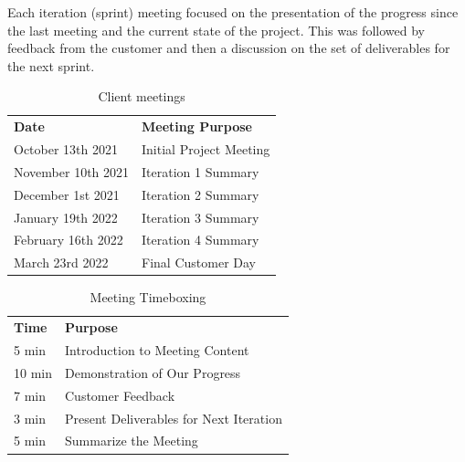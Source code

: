\documentclass{l3proj}
\begin{document}
        

        Each iteration (sprint) meeting focused on the presentation of the progress since the last meeting and the current state of the project. This was followed by feedback from the customer and then a discussion on the set of deliverables for the next sprint.
        
        \begin{center}
            \begin{table}[H]
                \centering
                \begin{tabular}{ll}
                \textbf{Date}      & \textbf{Meeting Purpose}
                \\
                October 13th 2021  & Initial Project Meeting \\
                November 10th 2021 & Iteration 1 Summary     \\
                December 1st 2021  & Iteration 2 Summary     \\
                January 19th 2022  & Iteration 3 Summary     \\
                February 16th 2022 & Iteration 4 Summary     \\
                March 23rd 2022    & Final Customer Day   
                \end{tabular}
                \quad
                \caption{Client meetings}
            \end{table}
        \end{center}
        \begin{center}
            \begin{table}[H]
                \centering
                \begin{tabular}{ll}
                    \textbf{Time}   & \textbf{Purpose}                                 \\
                    5  min  & Introduction to Meeting Content         \\
                    10 min & Demonstration of Our Progress           \\
                    7  min  & Customer Feedback                       \\
                    3  min  & Present Deliverables for Next Iteration \\
                    5  min  & Summarize the Meeting                  
                    \end{tabular}
                \label{tab:my_label}
                \caption{Meeting Timeboxing}
            \end{table}
        \end{center}
        
\end{document}
